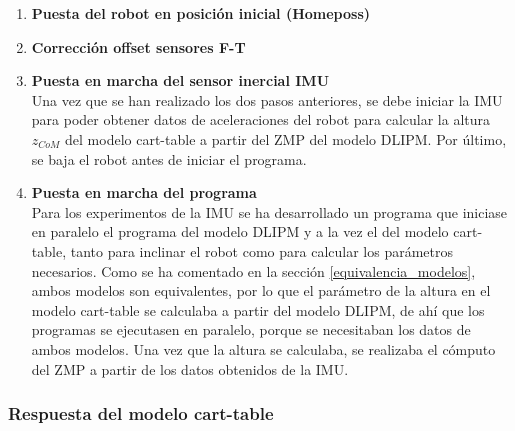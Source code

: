 \begin{enumerate}
\item \textbf{Puesta del robot en posición inicial (Homeposs)}

\item \textbf{Corrección offset sensores F-T} 

\item \textbf{Puesta en marcha del sensor inercial IMU}\\ Una vez que se han realizado los dos pasos anteriores, se debe iniciar la IMU para poder obtener datos de aceleraciones del robot para calcular la altura $z_{CoM}$ del modelo cart-table a partir del ZMP del modelo DLIPM. Por último, se baja el robot antes de iniciar el programa.

\item \textbf{Puesta en marcha del programa}\\ Para los experimentos de la IMU se ha desarrollado un programa que iniciase en paralelo el programa del modelo DLIPM y a la vez el del modelo cart-table, tanto para inclinar el robot como para calcular los parámetros necesarios. Como se ha comentado en la sección \ref{equivalencia_modelos}, ambos modelos son equivalentes, por lo que el parámetro de la altura en el modelo cart-table se calculaba a partir del modelo DLIPM, de ahí que los programas se ejecutasen en paralelo, porque se necesitaban los datos de ambos modelos. Una vez que la altura se calculaba, se realizaba el cómputo del ZMP a partir de los datos obtenidos de la IMU. %
\end{enumerate}

\subsubsection{Respuesta del modelo cart-table}

